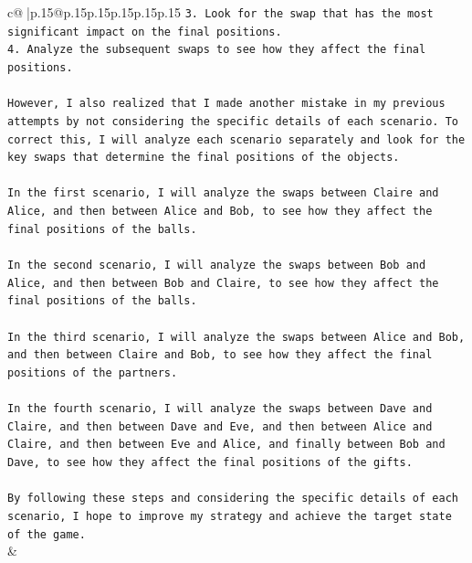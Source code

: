\documentclass{article}
\begin{document}
{\begin{supertabular}{c@{$\;$}|p{.15\linewidth}@{}p{.15\linewidth}p{.15\linewidth}p{.15\linewidth}p{.15\linewidth}p{.15\linewidth}}
{{{\texttt{3. Look for the swap that has the most significant impact on the final positions.} \\
\texttt{4. Analyze the subsequent swaps to see how they affect the final positions.} \\
\\ 
\texttt{However, I also realized that I made another mistake in my previous attempts by not considering the specific details of each scenario. To correct this, I will analyze each scenario separately and look for the key swaps that determine the final positions of the objects.} \\
\\ 
\texttt{In the first scenario, I will analyze the swaps between Claire and Alice, and then between Alice and Bob, to see how they affect the final positions of the balls.} \\
\\ 
\texttt{In the second scenario, I will analyze the swaps between Bob and Alice, and then between Bob and Claire, to see how they affect the final positions of the balls.} \\
\\ 
\texttt{In the third scenario, I will analyze the swaps between Alice and Bob, and then between Claire and Bob, to see how they affect the final positions of the partners.} \\
\\ 
\texttt{In the fourth scenario, I will analyze the swaps between Dave and Claire, and then between Dave and Eve, and then between Alice and Claire, and then between Eve and Alice, and finally between Bob and Dave, to see how they affect the final positions of the gifts.} \\
\\ 
\texttt{By following these steps and considering the specific details of each scenario, I hope to improve my strategy and achieve the target state of the game.} \\
            }
        }
    }
    & \\ \\

\end{supertabular}
}
\end{document}

